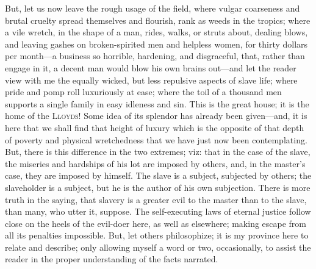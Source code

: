But, let us now leave the rough usage of the field, where vulgar
coarseness and brutal cruelty spread themselves and flourish, rank as
weeds in the tropics; where a vile wretch, in the shape of a man, rides,
walks, or struts about, dealing blows, and leaving gashes on
broken-spirited men and helpless women, for thirty dollars per month---a
business so horrible, hardening, and disgraceful, that, rather than
engage in it, a decent man would blow his own brains out---and let the
reader view with me the equally wicked, but less repulsive aspects of
slave life; where pride and pomp roll luxuriously at ease; where the
toil of a thousand men supports a single family in easy idleness and
sin. This is the great house; it is the home of the \textsc{Lloyds}!
Some idea of its splendor has already been given---and, it is here that
we shall find that height of luxury which is the opposite of that depth
of poverty and physical wretchedness that we have just now been
contemplating. But, there is this difference in the two extremes; viz:
that in the case of the slave, the miseries and hardships of his lot are
imposed by others, and, in the master's case, they are imposed by
himself. The slave is a subject, subjected by others; the slaveholder is
a subject, but he is the author of his own subjection. There is more
truth in the saying, that slavery is a greater evil to the master than
to the slave, than many, who utter it, suppose. The self-executing laws
of eternal justice follow close on the heels of the evil-doer here, as
well as {\protect\hypertarget{106}{}{}}elsewhere; making escape from all
its penalties impossible. But, let others philosophize; it is my
province here to relate and describe; only allowing myself a word or
two, occasionally, to assist the reader in the proper understanding of
the facts narrated.
